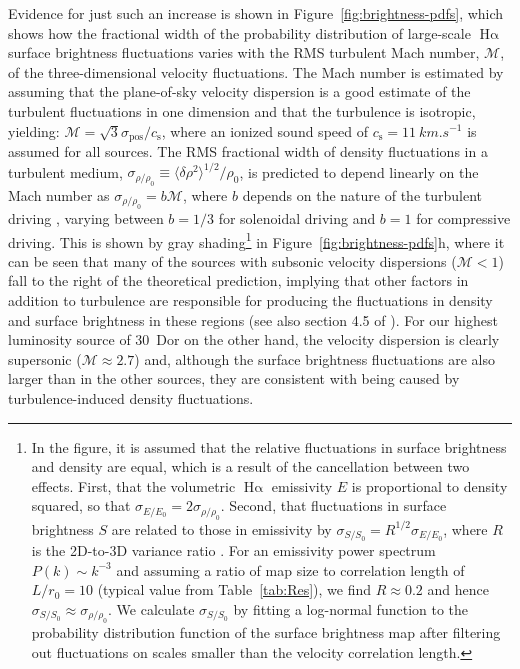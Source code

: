 \documentclass[fleqn,usenatbib, useAMS, a4paper]{mnras}
\newcommand\pos{\ensuremath{_{\mathrm{pos}}}}
\newcommand\ha{\ensuremath{\text{H}\upalpha}}
\newcommand\csound{\ensuremath{c_{\text{s}}}}
\newcommand\Mach{\ensuremath{\mathcal{M}}}
\begin{document}
Evidence for just such an increase is shown in Figure~\ref{fig:brightness-pdfs},
which shows how the fractional width of the probability distribution of
large-scale \ha{} surface brightness fluctuations
varies with the RMS turbulent Mach number, \Mach{},
of the three-dimensional velocity fluctuations.
The Mach number is estimated by assuming that the plane-of-sky velocity dispersion is
a good estimate of the turbulent fluctuations in one dimension
and that the turbulence is isotropic, yielding:
\(\Mach = \sqrt{3} \sigma\pos / \csound\),
where an ionized sound speed of \(\csound = \SI{11}{km.s^{-1}}\)
is assumed for all sources.
\newcommand\longsig[1]{\ensuremath{\langle \delta #1^2 \rangle^{1/2} / #1_0}}
\newcommand\shortsig[1]{\ensuremath{\sigma_{#1/#1_0}}}
The RMS fractional width of density fluctuations in a turbulent medium,
\(\shortsig{\rho} \equiv \longsig{\rho}\),
is predicted to depend linearly on the Mach number as
\(\shortsig{\rho} = b \Mach\),
where \(b\) depends on the nature of the turbulent driving \citep{Federrath:2010z},
varying between \(b = 1/3\) for solenoidal driving and \(b = 1\) for compressive driving.
This is shown by gray shading\footnote{\label{fn:brightness-fluctuations}%
  In the figure, it is assumed that the relative fluctuations in surface brightness
  and density are equal, which is a result of the
  cancellation between two effects. First, that the volumetric \ha{} emissivity \(E\)
  is proportional to density squared, so that \(\shortsig{E} = 2 \shortsig{\rho}\). 
  Second, that fluctuations in surface brightness \(S\) are related to those in emissivity
  by \(\shortsig{S} = R^{1/2} \shortsig{E}\), where \(R\)
  is the 2D-to-3D variance ratio \citep{Brunt:2010b}.
  For an emissivity power spectrum \(P(k) \sim k^{-3}\)
  and assuming a ratio of map size to correlation length
  of \(L / r_0 = 10\) (typical value from Table~\ref{tab:Res}),
  we find \(R \approx 0.2\) and hence \(\shortsig{S} \approx \shortsig{\rho}\).
  We calculate \shortsig{S} by fitting a log-normal
  function to the probability distribution function
  of the surface brightness map after filtering out fluctuations
  on scales smaller than the velocity correlation length.
}
in Figure~\ref{fig:brightness-pdfs}h,
where it can be seen that many of the sources with subsonic velocity dispersions
(\(\Mach < 1\)) fall to the right of the theoretical prediction,
implying that other factors in addition to turbulence are responsible for
producing the fluctuations in density and surface brightness in these regions
(see also section 4.5 of \citealp{arthur2016turbulence}).
For our highest luminosity source of 30~Dor on the other hand,
the velocity dispersion is clearly supersonic (\(\Mach \approx 2.7\))
and, although the surface brightness fluctuations are also larger than in the other sources,
they are consistent with being caused by turbulence-induced density fluctuations.
\end{document}
